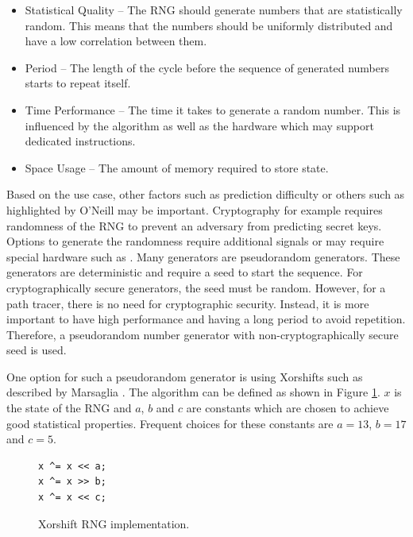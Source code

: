 \begin{itemize}
    \item{Statistical Quality} – The \gls{RNG} should generate numbers that are statistically random. This means that the numbers should be uniformly distributed and have a low correlation between them.
    \item{Period} – The length of the cycle before the sequence of generated numbers starts to repeat itself.
    \item{Time Performance} – The time it takes to generate a random number. This is influenced by the algorithm as well as the hardware which may support dedicated instructions.
    \item{Space Usage} – The amount of memory required to store state.
\end{itemize}

Based on the use case, other factors such as prediction difficulty or others such as highlighted by O’Neill \cite{o2014pcg} may be important. Cryptography for example requires randomness of the \gls{RNG} to prevent an adversary from predicting secret keys. Options to generate the randomness require additional signals \cite{randomnessCryptography} or may require special hardware such as  \cite{cloudflareLavaRand}. Many generators are pseudorandom generators. These generators are deterministic and require a seed to start the sequence. For cryptographically secure generators, the seed must be random.
However, for a path tracer, there is no need for cryptographic security. Instead, it is more important to have high performance and having a long period to avoid repetition. Therefore, a pseudorandom number generator with non-cryptographically secure seed is used.

One option for such a pseudorandom generator is using Xorshifts such as described by Marsaglia \cite{marsaglia2003xorshift}. The algorithm can be defined as shown in Figure \ref{code:xorShift}. $x$ is the state of the \gls{RNG} and $a$, $b$ and $c$ are constants which are chosen to achieve good statistical properties. Frequent choices for these constants are $a = 13$, $b = 17$ and $c = 5$.

\begin{figure}[H]
\begin{lstlisting}[style=wgsl]
x ^= x << a;
x ^= x >> b;
x ^= x << c;
\end{lstlisting}
\caption{Xorshift \gls{RNG} implementation.}
\label{code:xorShift}
\end{figure}

